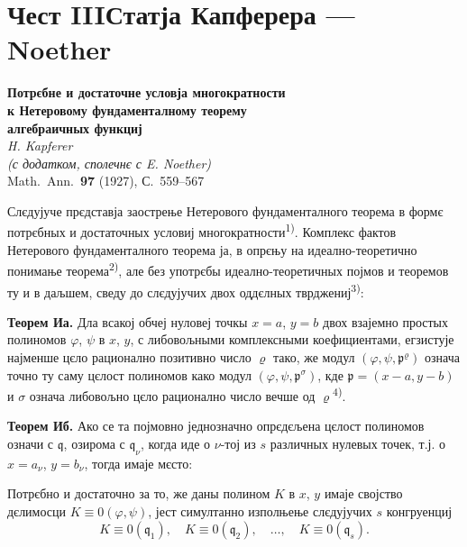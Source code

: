 \documentclass[11pt]{article}
\newcommand{\foreign}[1]{#1}
\theoremstyle{plain}
\begin{document}
\newpage
\part*{Чест III\hspace{1em}Статја Капферера --- Noether}

\begin{center}
\Large\textbf{Потрєбне и достаточне условја многократности}\\[0.3em]
\Large\textbf{к Нетеровому фундаменталному теорему}\\[0.5em]
\large\textbf{алгебраичных функциј}\\[1em]
\normalsize\textit{H. Kapferer}\\[0.5em]
\small\textit{(с додатком, сполечнє с E. Noether)}\\[1em]
\normalsize \foreign{Math.\ Ann.}\ \textbf{97} (1927), С.~559--567
\end{center}

\vspace{1em}

Слєдујуче прєдставја заострење Нетерового фундаменталного
теорема в формє потрєбных и достаточных условиј
многократности\textsuperscript{1)}. Комплекс фактов Нетерового
фундаменталного теорема ја, в опрєњу на идеално-теоретично
понимање теорема\textsuperscript{2)}, але без употрєбы
идеално-теоретичных појмов и теоремов ту и в даљшем, сведу до
слєдујучих двох оддєлных тврджениј\textsuperscript{3)}:

\smallskip
\textbf{Теорем Иа.} Дла всакој обчеј нуловеј точкы $x = a$,
$y = b$ двох взајемно простых полиномов $\varphi$, $\psi$ в $x$, $y$,
с либовољными комплексными коефициентами, егзистује најменше цєло
рационално позитивно число $\varrho$ тако, же модул
$(\varphi, \psi, \mathfrak{p}^{\varrho})$ означа точно ту саму
цєлост полиномов како модул $(\varphi, \psi, \mathfrak{p}^{\sigma})$,
кде $\mathfrak{p} = (x-a, y-b)$ и $\sigma$ означа либовољно цєло
рационално число вечше од $\varrho$\textsuperscript{4)}.

\smallskip
\textbf{Теорем Иб.} Ако се та појмовно једнозначно опрєдєљена
цєлост полиномов означи с $\mathfrak{q}$, озирома с
$\mathfrak{q}_{\nu}$, когда иде о $\nu$-тој из $s$ различных нулевых
точек, т.ј. о $x = a_{\nu}$, $y = b_{\nu}$, тогда имаје мєсто:

Потрєбно и достаточно за то, же даны полином $K$ в $x$, $y$ имаје
својство дєлимосци $K \equiv 0(\varphi, \psi)$, јест симултанно
изполњење слєдујучих $s$ конгруенциј
\[
K \equiv 0(\mathfrak{q}_{1}), \quad K \equiv 0(\mathfrak{q}_{2}), \quad\ldots,\quad
K \equiv 0(\mathfrak{q}_{s}).
\]
\end{document}

